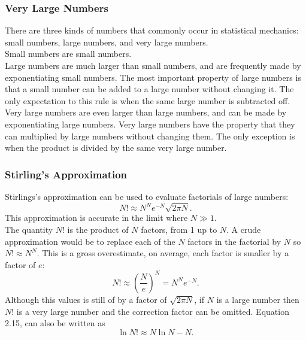 \documentclass[11pt]{exam}
\begin{document}
\subsubsection*{Very Large Numbers}
There are three kinds of numbers that commonly occur in statistical mechanics: small numbers, large numbers, and very large numbers.\\
\hspace*{10mm}Small numbers are small numbers. \\
\hspace*{10mm}Large numbers are much larger than small numbers, and are frequently made by exponentiating small numbers. The most important property of large numbers is that a small number can be added to a large number without changing it. The only expectation to this rule is when the same large number is subtracted off.\\
\hspace*{10mm}Very large numbers are even larger than large numbers, and can be made by exponentiating large numbers. Very large numbers have the property that they can multiplied by large numbers without changing them. The only exception is when the product is divided by the same very large number. 
\subsubsection*{Stirling's Approximation}
Stirlings's approximation can be used to evaluate factorials of large numbers: 
\begin{equation}\tag{2.14}
N!\approx N^N e^{-N}\sqrt{2\pi N}.
\end{equation}
This approximation is accurate in the limit where $N\gg1$. \\
\hspace*{10mm}The quantity $N!$ is the product of $N$ factors, from 1 up to $N$. A crude approximation would be to replace each of the $N$ factors in the factorial by $N$ so $N!\approx N^N$. This is a gross overestimate, on average, each factor is smaller by a factor of $e$:
\begin{equation}\tag{2.15}
    N!\approx \left(\frac{N}{e}\right)^N = N^Ne^{-N}.
\end{equation}
Although this values is still of by a factor of $\sqrt{2\pi N}$, if $N$ is a large number then $N!$ is a very large number and the correction factor can be omitted. Equation 2.15, can also be written as 
\begin{equation}\tag{2.16}
    \ln{N!}\approx N\ln{N} - N.
\end{equation}
\newpage
\end{document}
